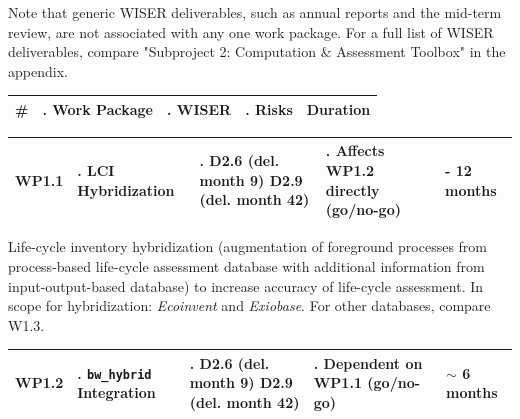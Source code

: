 \documentclass{article}
\begin{document}
    Note that generic WISER deliverables, such as annual reports and the mid-term review, are not associated with any one work package. For a full list of WISER deliverables, compare "Subproject 2: Computation \& Assessment Toolbox" in the appendix. 

    \begin{table}[H]
        \centering
        
        \begin{tabularx}{\linewidth}{
            |>{\hsize=0.25\hsize}X
            |>{\hsize=1.\hsize}X
            |>{\hsize=1.\hsize}X
            |>{\hsize=1.\hsize}X
            |>{\hsize=0.75\hsize}X|
          } %
            \hline
                \textbf{\#} & \textbf{Work Package} & \textbf{WISER} & \textbf{Risks} & \textbf{Duration}
            \\
            \hline
        \end{tabularx}
        
        \begin{tabularx}{\linewidth}{
            |>{\hsize=0.25\hsize}X
            |>{\hsize=1.\hsize}X
            |>{\hsize=1.\hsize}X
            |>{\hsize=1.\hsize}X
            |>{\hsize=0.75\hsize}X|
          } %
            \hline
                WP1.1
            &
                LCI Hybridization 
            &
                D2.6 (del. month 9) \newline D2.9 (del. month 42)
            &
                Affects WP1.2 directly (go/no-go)
            &
                11 - 12 months
            \\
            \hline
        \end{tabularx}
        
    \end{table}
    
    Life-cycle inventory hybridization (augmentation of foreground processes from process-based life-cycle assessment database with additional information from input-output-based database) to increase accuracy of life-cycle assessment. In scope for hybridization: \textit{Ecoinvent} and \textit{Exiobase}. For other databases, compare W1.3.

    \begin{table}[H]
        \centering
        \begin{tabularx}{\linewidth}{
            |>{\hsize=0.25\hsize}X
            |>{\hsize=1.\hsize}X
            |>{\hsize=1.\hsize}X
            |>{\hsize=1.\hsize}X
            |>{\hsize=0.75\hsize}X|
          } %
            \hline
                WP1.2
            &
                \texttt{bw\_hybrid} Integration
            &
                D2.6 (del. month 9) \newline D2.9 (del. month 42)
            &
                Dependent on WP1.1 (go/no-go)
            &
                $\sim$ 6 months
            \\
            \hline
        \end{tabularx}
    \end{table}
    
\end{document}
